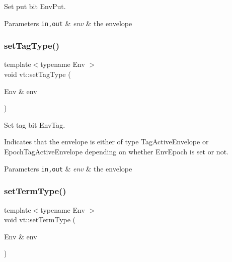 Set put bit {\ttfamily Env\+Put}. 


\begin{DoxyParams}[1]{Parameters}
\mbox{\tt in,out}  & {\em env} & the envelope \\
\hline
\end{DoxyParams}
\mbox{\label{namespacevt_ad088db89648b82eef7ca9b4837a907cd}} 
\subsubsection{\texorpdfstring{set\+Tag\+Type()}{setTagType()}}
{\footnotesize\ttfamily template$<$typename Env $>$ \\
void vt\+::set\+Tag\+Type (\begin{DoxyParamCaption}\item[{Env \&}]{env }\end{DoxyParamCaption})\hspace{0.3cm}{\ttfamily [inline]}}



Set tag bit {\ttfamily Env\+Tag}. 

Indicates that the envelope is either of type {\ttfamily Tag\+Active\+Envelope} or {\ttfamily Epoch\+Tag\+Active\+Envelope} depending on whether {\ttfamily Env\+Epoch} is set or not.


\begin{DoxyParams}[1]{Parameters}
\mbox{\tt in,out}  & {\em env} & the envelope \\
\hline
\end{DoxyParams}
\mbox{\label{namespacevt_aa42d7e0adc8b283dd10602ece422699d}} 
\subsubsection{\texorpdfstring{set\+Term\+Type()}{setTermType()}}
{\footnotesize\ttfamily template$<$typename Env $>$ \\
void vt\+::set\+Term\+Type (\begin{DoxyParamCaption}\item[{Env \&}]{env }\end{DoxyParamCaption})\hspace{0.3cm}{\ttfamily [inline]}}



